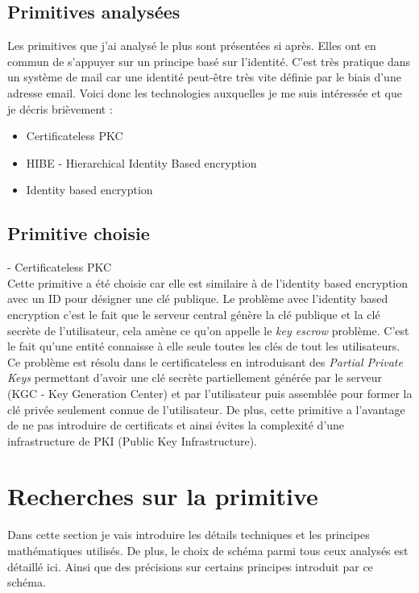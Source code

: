 \subsection{Primitives analysées}
Les primitives que j'ai analysé le plus sont présentées si après. Elles ont en commun de s'appuyer sur un principe basé sur l'identité. C'est très pratique dans un système de mail car une identité peut-être très vite définie par le biais d'une adresse email. Voici donc les technologies auxquelles je me suis intéressée et que je décris brièvement :
\begin{itemize}
	\item Certificateless PKC~\cite{DBLP:conf/asiacrypt/Al-RiyamiP03}
	\item HIBE - Hierarchical Identity Based encryption~\cite{DBLP:conf/eurocrypt/HorwitzL02}
	\item Identity based encryption~\cite{DBLP:conf/crypto/Shamir84}
\end{itemize}
\subsection{Primitive choisie}
- Certificateless PKC~\cite{DBLP:conf/asiacrypt/Al-RiyamiP03}\\
 Cette primitive a été choisie car elle est similaire à de l'identity based encryption avec un ID pour désigner une clé publique. Le problème avec l'identity based encryption c'est le fait que le serveur central génère la clé publique et la clé secrète de l'utilisateur, cela amène ce qu'on appelle le \textit{key escrow} problème. C'est le fait qu'une entité connaisse à elle seule toutes les clés de tout les utilisateurs. Ce problème est résolu dans le certificateless en introduisant des \textit{Partial Private Keys} permettant d'avoir une clé secrète partiellement générée par le serveur (KGC - Key Generation Center) et par l'utilisateur puis assemblée pour former la clé privée seulement connue de l'utilisateur. De plus, cette primitive a l'avantage de ne pas introduire de certificats et ainsi évites la complexité d'une infrastructure de PKI (Public Key Infrastructure).
\section{Recherches sur la primitive}
\label{sec:primitiveSearch}
Dans cette section je vais introduire les détails techniques et les principes mathématiques utilisés. De plus, le choix de schéma parmi tous ceux analysés est détaillé ici. Ainsi que des précisions sur certains principes introduit par ce schéma.
